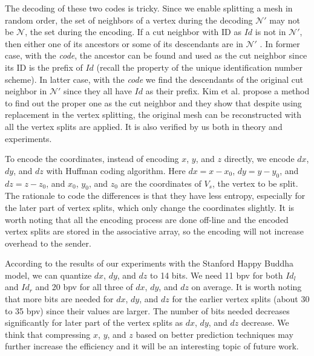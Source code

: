     The decoding of these two codes is tricky. %
    Since we enable splitting a mesh in random order, the set of neighbors of a vertex
    during the decoding $\mathcal{N}'$ may not be $\mathcal{N}$, the set during the encoding.
    If a cut neighbor with ID as $Id$ %
    is not in $\mathcal{N}'$, then either one of its 
    ancestors or some of its descendants are in $\mathcal{N}'$ \cite{multiresolution:kim}.
    In former case, with the \emph{code}, the ancestor can be found and used as 
    the cut neighbor since its ID is the prefix of $Id$ 
    (recall the property of the unique identification number scheme).
    In latter case, with the \emph{code} we find the descendants of the original 
    cut neighbor in $\mathcal{N}'$ since they all have $Id$ as their prefix.
    Kim et al. \cite{multiresolution:kim} propose a method to find out the 
    proper one as the cut neighbor and they show that despite using replacement
    in the vertex splitting, the original mesh can be 
    reconstructed with all the vertex splits are applied. It is also verified 
    by us both in theory and experiments.
    
    To encode the coordinates, instead of encoding $x$, $y$, and $z$ directly, we encode $dx$, $dy$, and $dz$ with
    Huffman coding algorithm. Here $dx = x - x_0$, $dy = y - y_0$,
    and $dz = z - z_0$, and $x_0$, $y_0$, and $z_0$ are the coordinates of
    $V_s$, the vertex to be split. 
    The rationale to code the differences is that they have less entropy, especially
    for the later part of vertex splits, which only change the coordinates slightly.
    It is worth noting that all the encoding process are done off-line and the 
    encoded vertex splits are stored in the associative array, so the encoding will
    not increase overhead to the sender.

    According to the results of our experiments with the Stanford Happy Buddha model,
    we can quantize $dx$, $dy$, and $dz$ to 14 bits. 
    We need 11 bpv for both $Id_l$ and $Id_r$ 
    and 20 bpv for all three of $dx$, $dy$, and $dz$ on average.
    It is worth noting that more bits are needed for $dx$, $dy$, and $dz$ 
    for the earlier vertex splits (about 30 to 35 bpv)
    since their values are larger. 
    The number of bits needed decreases significantly for later part of the vertex splits
    as $dx$, $dy$, and $dz$ decrease. We think that compressing $x$, $y$, and $z$ 
    based on better prediction techniques may further increase the 
    efficiency and it will be an interesting topic of future work.

